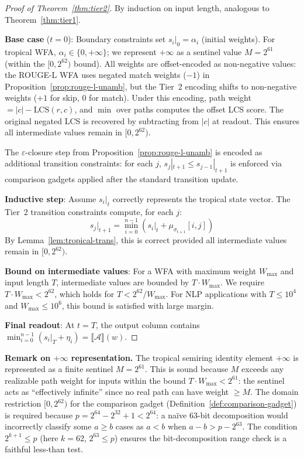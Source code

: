 \documentclass[11pt]{article}
\newcommand{\wfa}{\mathcal{A}}
\begin{document}
\begin{proof}[Proof of Theorem~\ref{thm:tier2}]
By induction on input length, analogous to Theorem~\ref{thm:tier1}.

\textbf{Base case} ($t=0$):
Boundary constraints set $s_i|_0 = \alpha_i$ (initial weights).
For tropical WFA, $\alpha_i \in \{0, +\infty\}$; we represent
$+\infty$ as a sentinel value $M = 2^{61}$ (within the $[0, 2^{62})$
bound).  All weights are offset-encoded as non-negative values:
the ROUGE-L WFA uses negated match weights ($-1$) in Proposition~\ref{prop:rouge-l-unamb},
but the Tier~2 encoding shifts to non-negative weights
($+1$ for skip, $0$ for match).  Under this encoding,
path weight $= |c| - \text{LCS}(r,c)$, and
$\min$ over paths computes the offset LCS score.
The original negated LCS is recovered by subtracting
from $|c|$ at readout.  This ensures all intermediate values
remain in $[0, 2^{62})$.

The $\varepsilon$-closure step from Proposition~\ref{prop:rouge-l-unamb}
is encoded as additional transition constraints:
for each $j$, $s_j|_{t+1} \leq s_{j-1}|_{t+1}$ is enforced via
comparison gadgets applied after the standard transition update.

\textbf{Inductive step}:
Assume $s_i|_t$ correctly represents the tropical state vector.
The Tier~2 transition constraints compute, for each $j$:
\[
  s_j|_{t+1} = \min_{i=0}^{n-1}(s_i|_t + \mu_{\sigma_{t+1}}[i,j])
\]
By Lemma~\ref{lem:tropical-trans}, this is correct provided all
intermediate values remain in $[0, 2^{62})$.

\textbf{Bound on intermediate values}:
For a WFA with maximum weight $W_{\max}$ and input length $T$,
intermediate values are bounded by $T \cdot W_{\max}$.
We require $T \cdot W_{\max} < 2^{62}$, which holds for
$T < 2^{62}/W_{\max}$.  For NLP applications with $T \leq 10^4$
and $W_{\max} \leq 10^6$, this bound is satisfied with large margin.

\textbf{Final readout}:
At $t = T$, the output column contains
$\min_{i=0}^{n-1}(s_i|_T + \eta_i) = \llbracket\wfa\rrbracket(w)$.
\end{proof}

\noindent\textbf{Remark on $+\infty$ representation.}
The tropical semiring identity element $+\infty$ is represented as
a finite sentinel $M = 2^{61}$.  This is sound because $M$ exceeds
any realizable path weight for inputs within the bound
$T \cdot W_{\max} < 2^{61}$: the sentinel acts as ``effectively
infinite'' since no real path can have weight $\geq M$.
The domain restriction $[0, 2^{62})$ for the comparison gadget
(Definition~\ref{def:comparison-gadget}) is required because
$p = 2^{64} - 2^{32} + 1 < 2^{64}$: a na\"ive 63-bit decomposition
would incorrectly classify some $a \geq b$ cases as $a < b$
when $a - b > p - 2^{63}$.  The condition $2^{k+1} \leq p$ (here
$k = 62$, $2^{63} \leq p$) ensures the bit-decomposition range check
is a faithful less-than test.
\end{document}
